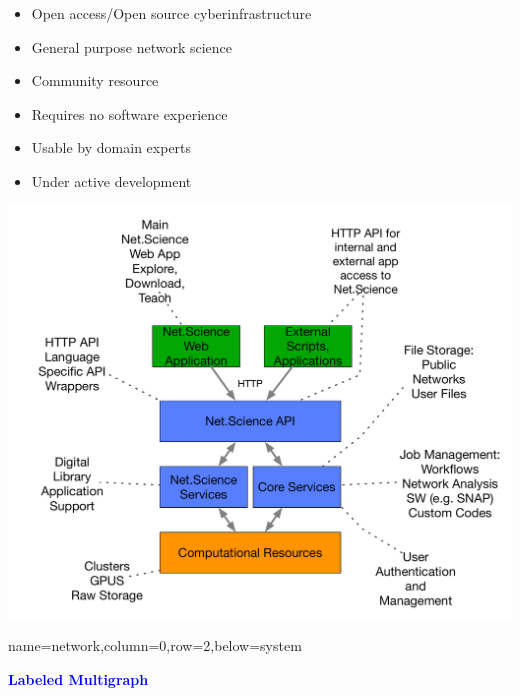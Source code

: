 \documentclass[landscape,paperwidth=70in,paperheight=46in,fontscale=0.225]{baposter} %
\begin{document}
\begin{poster}
{\begin{minipage}{.4\textwidth}
\begin{itemize}[leftmargin=*,noitemsep,topsep=0pt]
\item Open access/Open source cyberinfrastructure \smallskip
\item General purpose network science \smallskip
\item Community resource \smallskip
\item Requires no software experience \smallskip
\item Usable by domain experts \smallskip
\item Under active development
\end{itemize}
\end{minipage}
\hfill
\begin{minipage}{.60\textwidth}
\begin{center}
\includegraphics[scale=0.195]{figures/CINES_HOME_OVERVIEW-legacy.pdf}
\end{center}
\end{minipage}
}

          {name=network,column=0,row=2,below=system}{         

\begin{minipage}{.5\textwidth}
\begin{center}
\textcolor{blue}{\textbf{Labeled Multigraph}}
\end{center}
\vspace{3mm}


\end{minipage}}
\end{poster}
\end{document}
